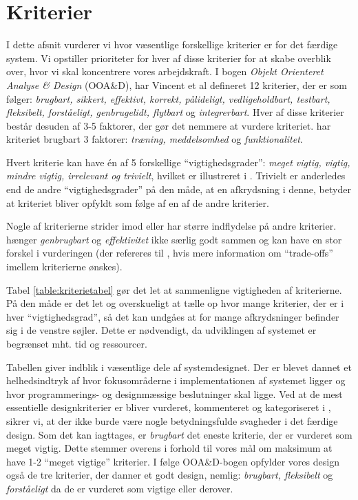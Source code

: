 \section{Kriterier}
\label{sec:kriterier}

I dette afsnit vurderer vi hvor væsentlige forskellige kriterier er for det færdige system. Vi opstiller prioriteter for hver af disse kriterier for at skabe overblik over, hvor vi skal koncentrere vores arbejdskraft. I bogen \emph{Objekt Orienteret Analyse \& Design} (OOA&D)\cite{ooad}, har Vincent et al defineret 12 kriterier, der er som følger: \emph{brugbart, sikkert, effektivt, korrekt, pålideligt, vedligeholdbart, testbart, fleksibelt, forståeligt, genbrugelidt, flytbart} og \emph{integrerbart}. Hver af disse kriterier består desuden af 3-5 faktorer, der gør det nemmere at vurdere kriteriet. \Fx har kriteriet brugbart 3 faktorer: \emph{træning, meddelsomhed} og \emph{funktionalitet}.

Hvert kriterie kan have én af 5 forskellige ``vigtighedsgrader'': \emph{meget vigtig, vigtig, mindre vigtig, irrelevant og trivielt}, hvilket er illustreret i . Trivielt er anderledes end de andre ``vigtighedsgrader'' på den måde, at en afkrydsning i denne, betyder at kriteriet bliver opfyldt som følge af en af de andre kriterier.
 
Nogle af kriterierne strider imod eller har større indflydelse på andre kriterier. \Fx hænger \emph{genbrugbart} og \emph{effektivitet} ikke særlig godt sammen og kan have en stor forskel i vurderingen (der refereres til \cite[s.~18]{crit}, hvis mere information om ``trade-offs'' imellem kriterierne ønskes).



Tabel \ref{table:kriterietabel} gør det let at sammenligne vigtigheden af kriterierne. På den måde er det let og overskueligt at tælle op hvor mange kriterier, der er i hver ``vigtighedsgrad'', så det kan undgåes at for mange afkrydsninger befinder sig i de venstre søjler. Dette er nødvendigt, da udviklingen af systemet er begrænset mht. tid og ressourcer.

Tabellen giver indblik i væsentlige dele af systemdesignet. Der er blevet dannet et helhedsindtryk af hvor fokusområderne i implementationen af systemet ligger og hvor programmerings- og designmæssige beslutninger skal ligge. Ved at de mest essentielle designkriterier er bliver vurderet, kommenteret og kategoriseret i , sikrer vi, at der ikke burde være nogle betydningsfulde svagheder i det færdige design. Som det kan iagttages, er \emph{brugbart} det eneste kriterie, der er vurderet som meget vigtig. Dette stemmer overens i forhold til vores mål om maksimum at have 1-2 ``meget vigtige'' kriterier. I følge OOA&D-bogen\cite{ooad} opfylder vores design også de tre kriterier, der danner et godt design, nemlig: \emph{brugbart, fleksibelt} og \emph{forståeligt} da de er vurderet som vigtige eller derover.

